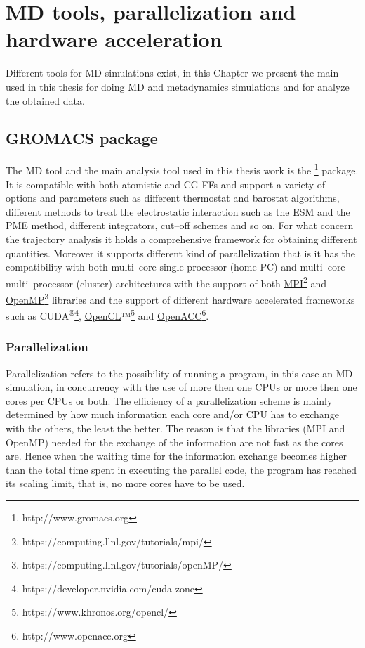 \chapter{MD tools, parallelization and hardware acceleration}
Different tools for \ac{MD} simulations exist, in this Chapter we present the main used in this thesis for doing \ac{MD} and metadynamics simulations and for analyze the obtained data.


\section{GROMACS package}
The \ac{MD} tool and the main analysis tool used in this thesis work is the \href{http://www.gromacs.org}{\gromacs}\footnote{http://www.gromacs.org}\cite{gromacsManual} package. It is compatible with both atomistic and \ac{CG} \acp{FF} and support a variety of options and parameters such as different thermostat and barostat algorithms, different methods to treat the electrostatic interaction such as the \ac{ESM} and the \ac{PME} method, different integrators, cut--off schemes and so on. For what concern the trajectory analysis it holds a comprehensive framework for obtaining different quantities. Moreover it supports different kind of parallelization that is it has the compatibility with both multi--core single processor (home PC) and multi--core multi--processor (cluster) architectures with the support of both \href{https://computing.llnl.gov/tutorials/mpi/}{MPI}\footnote{https://computing.llnl.gov/tutorials/mpi/} and \href{https://computing.llnl.gov/tutorials/openMP/}{OpenMP}\footnote{https://computing.llnl.gov/tutorials/openMP/} libraries and the support of different hardware accelerated frameworks such as CUDA\textsuperscript{®}\footnote{https://developer.nvidia.com/cuda-zone}, \href{https://www.khronos.org/opencl/}{OpenCL}™\footnote{https://www.khronos.org/opencl/} and \href{http://www.openacc.org}{OpenACC}\footnote{http://www.openacc.org}.  

\subsection{Parallelization}
Parallelization refers to the possibility of running a program, in this case an \ac{MD} simulation, in concurrency with the use of more then one CPUs or more then one cores per CPUs or both. The efficiency of a parallelization scheme is mainly determined by how much information each core and/or CPU has to exchange with the others, the least the better. The reason is that the libraries (MPI and OpenMP) needed for the exchange of the information are not fast as the cores are. Hence when the waiting time for the information exchange becomes higher than the total time spent in executing the parallel code, the program has reached its scaling limit, that is, no more cores have to be used.

